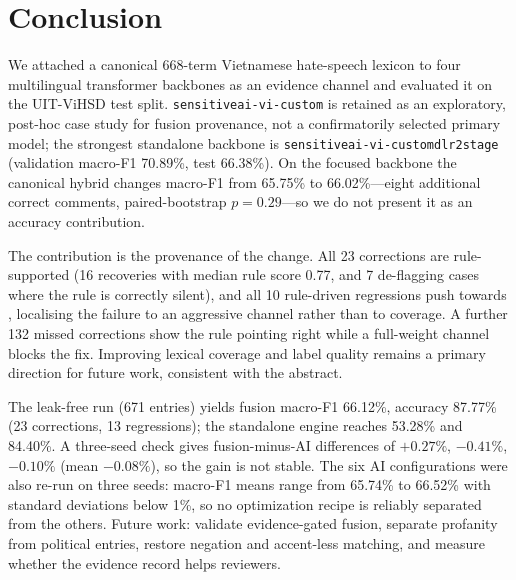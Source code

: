 \section{Conclusion}
\label{sec:conclusion}

We attached a canonical 668-term Vietnamese hate-speech lexicon to four
multilingual transformer backbones as an evidence channel and evaluated it on
the UIT-ViHSD \cite{luu2021vihsd} test split. \texttt{sensitiveai-vi-custom} is retained as an
exploratory, post-hoc case study for fusion provenance, not a confirmatorily
selected primary model; the strongest standalone backbone is
\texttt{sensitiveai-vi-customdlr2stage} (validation macro-F1 70.89\%, test
66.38\%). On the focused backbone the canonical hybrid changes macro-F1 from
65.75\% to 66.02\%---eight additional correct comments, paired-bootstrap
$p=0.29$---so we do not present it as an accuracy contribution.

The contribution is the provenance of the change. All 23 corrections are
rule-supported (16 \hate{} recoveries with median rule score 0.77, and 7
\clean{} de-flagging cases where the rule is correctly silent), and all 10
rule-driven regressions push towards \hate{}, localising the failure to an
aggressive channel rather than to coverage. A further 132 missed corrections show the rule pointing right while a full-weight
\clean{} channel blocks the fix. Improving lexical coverage and label quality remains a primary direction for future work, consistent with the abstract.

The leak-free run (671 entries) yields fusion macro-F1 66.12\%, accuracy 87.77\% (23
corrections, 13 regressions); the standalone engine reaches 53.28\% and 84.40\%. A
three-seed check gives fusion-minus-AI differences of $+0.27\%$, $-0.41\%$, $-0.10\%$
(mean $-0.08\%$), so the gain is not stable. The six AI configurations were also
re-run on three seeds: macro-F1 means range from 65.74\% to 66.52\% with standard
deviations below 1\%, so no optimization recipe is reliably separated from the
others.
Future work: validate evidence-gated fusion, separate profanity from
political entries, restore negation and accent-less matching, and measure
whether the evidence record helps reviewers.